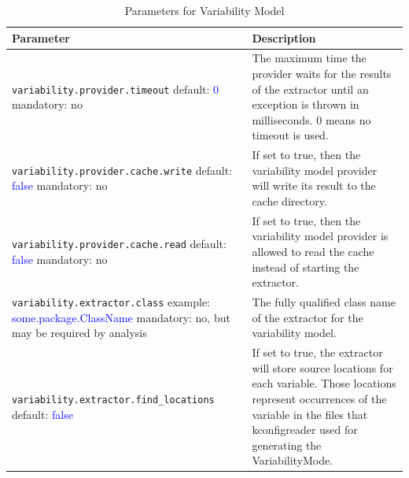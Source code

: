 \begin{table}[t] %
    \caption{Parameters for Variability Model} \label{tab:propfile}
    \begin{tabularx}{\textwidth}{|p{}|p{}|}\hline
        \textbf{Parameter} & \textbf{Description} \\ \hline \hline
        
        \texttt{variability.provider.timeout} \newline default: \textcolor{blue}{0} \newline mandatory: no  & The maximum time the provider waits for the results of the extractor until an exception is thrown in milliseconds. 0 means no timeout is used. \\ \hline
        
        \texttt{variability.provider.cache.write} \newline default: \textcolor{blue}{false} \newline mandatory: no & If set to true, then the variability model provider will write its result to the cache directory. \\ \hline 
        
        \texttt{variability.provider.cache.read} \newline default: \textcolor{blue}{false} \newline mandatory: no & If set to true, then the variability model provider is allowed to read the cache instead of starting the extractor.\\ \hline
                
        \texttt{variability.extractor.class} \newline example: \textcolor{blue}{some.package.ClassName}  \newline mandatory: no, but may be required by analysis & The fully qualified class name of the extractor for the variability model. \\ \hline
        
        \texttt{variability.extractor.}\newline \texttt{find\_locations} \newline default: \textcolor{blue}{false}  & If set to true, the extractor will store source locations for each variable. Those locations represent occurrences of the variable in the files that kconfigreader used for generating the VariabilityMode. \\ \hline
     
    \end{tabularx}
\end{table}

